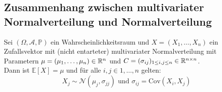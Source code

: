 \subsection{Zusammenhang zwischen multivariater Normalverteilung und Normalverteilung}
\begin{Satz}
	Sei $ (\Omega,\mathcal{A},\mathbb{P}) $ ein Wahrscheinlichkeitsraum und $ X = (X_1,\dots,X_n) $ ein Zufallsvektor mit (nicht entarteter) multivariater Normalverteilung mit Parametern $ \mu = (\mu_1,\dots,\mu_n) \in \mathbb{R}^n $ und $ C = (\sigma_{ij})_{1 \leq i,j \leq n} \in \mathbb{R}^{n \times n} $.\\
	Dann ist $ \mathbb{E}[X] = \mu $ und für alle $ i,j \in {1,\dots,n}  $ gelten:
	\[
		 X_j \sim \mathcal{N}(\mu_j,\sigma_{jj}) \text{ und } \sigma_{ij} = \text{Cov}(X_i,X_j)
	\]
\end{Satz}
